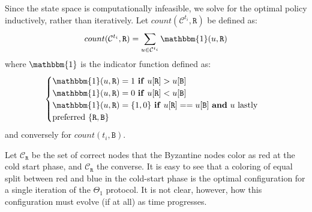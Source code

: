 Since the state space is computationally infeasible, we solve for the optimal policy inductively, rather than iteratively. 
Let $count(\mathcal{C}^{t_i}, \mathtt{R})$ be defined as: 
\begin{equation}
\begin{split}
    count(\mathcal{C}^{t_i}, \mathtt{R}) = \sum_{u \in \mathcal{C}^{t_i}} \mathbbm{1}(u, \mathtt{R})
\end{split}
\end{equation}
where $\mathbbm{1}$ is the indicator function defined as:
\begin{equation}
\begin{cases}
    \mathbbm{1}(u, \mathtt{R}) = 1\ \text{\textbf{if}}\ u[\mathtt{R}] > u[\mathtt{B}]\\
    \mathbbm{1}(u, \mathtt{R}) = 0\ \text{\textbf{if}}\ u[\mathtt{R}] < u[\mathtt{B}]\\
    \mathbbm{1}(u, \mathtt{R}) = \{1, 0\}\ \text{\textbf{if}}\ u[\mathtt{R}] == u[\mathtt{B}]\ \text{\textbf{and} $u$ lastly}\\
    \text{preferred $\{\mathtt{R}, \mathtt{B}\}$}
\end{cases}
\end{equation}
and conversely for $count(t_i, \mathtt{B})$. 

Let $\mathcal{C}_{\mathtt{R}}$ be the set of correct nodes that the Byzantine nodes color as red at the cold start phase, and $\mathcal{C}_\mathtt{R}$ the converse. It is easy to see that a coloring of equal split between red and blue in the cold-start phase is the optimal configuration for a single iteration of the $\Theta_1$ protocol. It is not clear, however, how this configuration must evolve (if at all) as time progresses. 

